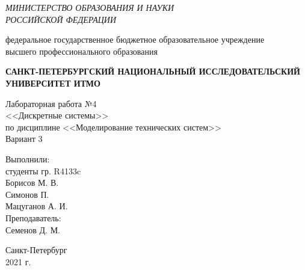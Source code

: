 \begin{titlepage}
    \begin{center}
        \textit{МИНИСТЕРСТВО ОБРАЗОВАНИЯ И НАУКИ\\
        РОССИЙСКОЙ ФЕДЕРАЦИИ}
        \vspace{1ex}

        федеральное государственное бюджетное образовательное учреждение\\
        высшего профессионального образования
        \vspace{1ex}

        \textbf{САНКТ-ПЕТЕРБУРГСКИЙ НАЦИОНАЛЬНЫЙ ИССЛЕДОВАТЕЛЬСКИЙ УНИВЕРСИТЕТ ИТМО}
        \vspace{13ex}

        Лабораторная работа №4\\
        <<Дискретные системы>>\\
        по дисциплине <<Моделирование технических систем>>\\
        \vspace{1em}
        Вариант 3\\
    \end{center}
    \vspace{14em}
    \begin{flushright}
        \noindent
        Выполнили:\\
        студенты гр. R4133c\\
        Борисов М. В.\\
        Симонов П.\\
        Мацуганов А. И.\\
        \vspace{1em}
        Преподаватель:\\
        Семенов Д. М.
    \end{flushright}
    \vfill
    \begin{center}
        \large{Санкт-Петербург}\\
        2021 г.\\
    \end{center}
\end{titlepage}
